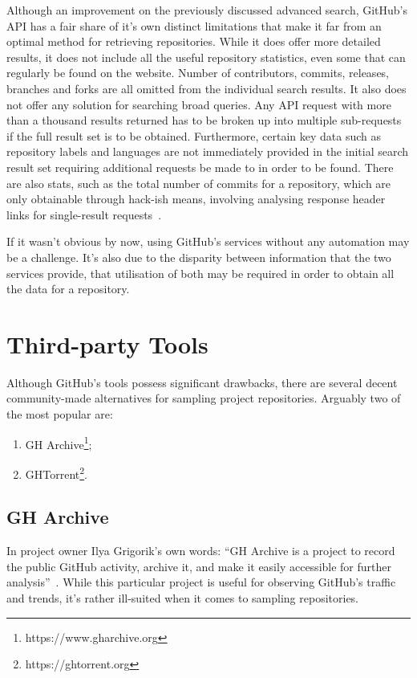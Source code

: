 Although an improvement on the previously discussed advanced search, GitHub's API has a fair share of it's own distinct limitations that make it far from an optimal method for retrieving repositories.
While it does offer more detailed results, it does not include all the useful repository statistics, even some that can regularly be found on the website.
Number of contributors, commits, releases, branches and forks are all omitted from the individual search results.
It also does not offer any solution for searching broad queries.
Any API request with more than a thousand results returned has to be broken up into multiple sub-requests if the full result set is to be obtained.
Furthermore, certain key data such as repository labels and languages are not immediately provided in the initial search result set requiring additional requests be made to in order to be found.
There are also stats, such as the total number of commits for a repository, which are only obtainable through hack-ish means, involving analysing response header links for single-result requests~\cite{GIST1}.

If it wasn't obvious by now, using GitHub's services without any automation may be a challenge.
It's also due to the disparity between information that the two services provide, that utilisation of both may be required in order to obtain all the data for a repository.

\section{Third-party Tools}

Although GitHub's tools possess significant drawbacks, there are several decent community-made alternatives for sampling project repositories.
Arguably two of the most popular are:
\begin{enumerate}
    \item GH Archive\footnote{https://www.gharchive.org};
    \item GHTorrent\footnote{https://ghtorrent.org}.
\end{enumerate}

\subsection{GH Archive}

In project owner Ilya Grigorik's own words: ``GH Archive is a project to record the public GitHub activity, archive it, and make it easily accessible for further analysis''~\cite{GHA}.
While this particular project is useful for observing GitHub's traffic and trends, it's rather ill-suited when it comes to sampling repositories.

